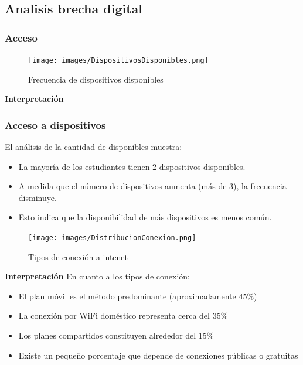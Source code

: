 \documentclass[12pt, a4paper]{article}
\begin{document}
\subsection{Analisis brecha digital}

\subsubsection{Acceso}

\begin{figure}[H]
    \begin{center}
        \texttt{[image: images/DispositivosDisponibles.png]}
    \end{center}
    \label{fig:DispositivosDisponibles}
    \caption{Frecuencia de dispositivos disponibles}
\end{figure}

\textbf{Interpretación}
\subsubsection{Acceso a dispositivos}
El análisis de la cantidad de disponibles muestra:
\begin{itemize}
    \item La mayoría de los estudiantes tienen 2 dispositivos disponibles.
    \item A medida que el número de dispositivos aumenta (más de 3), la frecuencia disminuye.
    \item Esto indica que la disponibilidad de más dispositivos es menos común.
\end{itemize}

\begin{figure}[H]
    \begin{center}
        \texttt{[image: images/DistribucionConexion.png]}
    \end{center}
    \label{fig:DistribucionConexion}
    \caption{Tipos de conexión a intenet}
\end{figure}

\textbf{Interpretación}
En cuanto a los tipos de conexión:
\begin{itemize}
    \item El plan móvil es el método predominante (aproximadamente 45\%)
    \item La conexión por WiFi doméstico representa cerca del 35\%
    \item Los planes compartidos constituyen alrededor del 15\%
    \item Existe un pequeño porcentaje que depende de conexiones públicas o gratuitas
\end{itemize}
\end{document}
